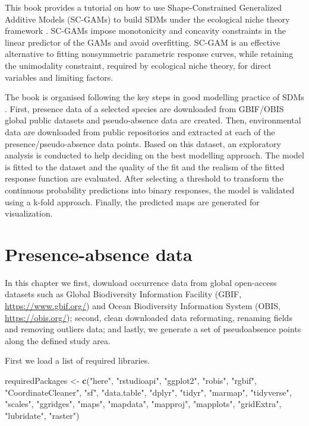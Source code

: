 \documentclass[
]{book}
\newenvironment{Shaded}{\begin{snugshade}}{\end{snugshade}}
\newcommand{\FunctionTok}[1]{\textcolor[rgb]{0.13,0.29,0.53}{\textbf{#1}}}
\newcommand{\NormalTok}[1]{#1}
\newcommand{\OtherTok}[1]{\textcolor[rgb]{0.56,0.35,0.01}{#1}}
\newcommand{\StringTok}[1]{\textcolor[rgb]{0.31,0.60,0.02}{#1}}
\begin{document}
This book provides a tutorial on how to use Shape-Constrained Generalized Additive Models (SC-GAMs) \citep{pya_etal_2015} to build SDMs under the ecological niche theory framework \citep{citores_etal_2020}. SC-GAMs impose monotonicity and concavity constraints in the linear predictor of the GAMs and avoid overfitting. SC-GAM is an effective alternative to fitting nonsymmetric parametric response curves, while retaining the unimodality constraint, required by ecological niche theory, for direct variables and limiting factors.

The book is organised following the key steps in good modelling practice of SDMs \citep{elith_etal_2009}. First, presence data of a selected species are downloaded from GBIF/OBIS global public datasets and pseudo-absence data are created. Then, environmental data are downloaded from public repositories and extracted at each of the presence/pseudo-absence data points. Based on this dataset, an exploratory analysis is conducted to help deciding on the best modelling approach. The model is fitted to the dataset and the quality of the fit and the realism of the fitted response function are evaluated. After selecting a threshold to transform the continuous probability predictions into binary responses, the model is validated using a k-fold approach. Finally, the predicted maps are generated for visualization.

\chapter{Presence-absence data}\label{presence-absence-data}

In this chapter we first, download occurrence data from global open-access datasets such as Global Biodiversity Information Facility (GBIF, \url{https://www.gbif.org/}) and Ocean Biodiversity Information System (OBIS, \url{https://obis.org/}); second, clean downloaded data reformating, renaming fields and removing outliers data; and lastly, we generate a set of pseudoabsence points along the defined study area.

First we load a list of required libraries.

\begin{Shaded}
\begin{Highlighting}[]
\NormalTok{requiredPackages }\OtherTok{\textless{}{-}} \FunctionTok{c}\NormalTok{(}\StringTok{"here"}\NormalTok{, }\StringTok{"rstudioapi"}\NormalTok{,}
    \StringTok{"ggplot2"}\NormalTok{, }\StringTok{"robis"}\NormalTok{, }\StringTok{"rgbif"}\NormalTok{, }\StringTok{"CoordinateCleaner"}\NormalTok{,}
    \StringTok{"sf"}\NormalTok{, }\StringTok{"data.table"}\NormalTok{, }\StringTok{"dplyr"}\NormalTok{, }\StringTok{"tidyr"}\NormalTok{,}
    \StringTok{"marmap"}\NormalTok{, }\StringTok{"tidyverse"}\NormalTok{, }\StringTok{"scales"}\NormalTok{, }\StringTok{"ggridges"}\NormalTok{,}
    \StringTok{"maps"}\NormalTok{, }\StringTok{"mapdata"}\NormalTok{, }\StringTok{"mapproj"}\NormalTok{, }\StringTok{"mapplots"}\NormalTok{,}
    \StringTok{"gridExtra"}\NormalTok{, }\StringTok{"lubridate"}\NormalTok{, }\StringTok{"raster"}\NormalTok{)}
\end{Highlighting}
\end{Shaded}
\end{document}
